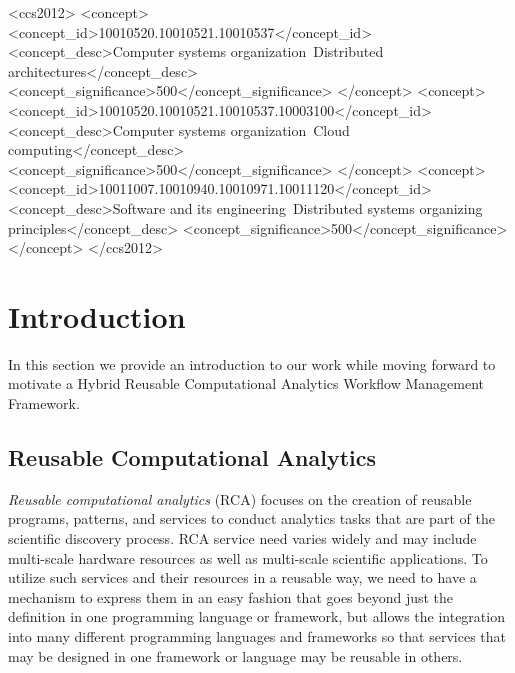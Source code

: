% 


\begin{CCSXML}
<ccs2012>
<concept>
<concept_id>10010520.10010521.10010537</concept_id>
<concept_desc>Computer systems organization~Distributed architectures</concept_desc>
<concept_significance>500</concept_significance>
</concept>
<concept>
<concept_id>10010520.10010521.10010537.10003100</concept_id>
<concept_desc>Computer systems organization~Cloud computing</concept_desc>
<concept_significance>500</concept_significance>
</concept>
<concept>
<concept_id>10011007.10010940.10010971.10011120</concept_id>
<concept_desc>Software and its engineering~Distributed systems organizing principles</concept_desc>
<concept_significance>500</concept_significance>
</concept>
</ccs2012>
\end{CCSXML}







\maketitle

% 


\section{Introduction}

In this section we provide an introduction to our work while
moving forward to motivate a 
Hybrid Reusable Computational Analytics Workflow
Management Framework.

\subsection{Reusable Computational Analytics}

{\em Reusable computational analytics} (RCA) focuses on the creation of reusable programs, patterns, and services to conduct analytics tasks that are part of the scientific discovery process. RCA service need varies widely and may include multi-scale hardware resources as well as multi-scale scientific applications. To utilize such services and their resources in a reusable way, we need to have a mechanism to express them in an easy fashion that goes beyond just the definition in one programming language or framework, but allows the integration into many different programming languages and frameworks so that services that may be designed in one framework or language may be reusable in others.

